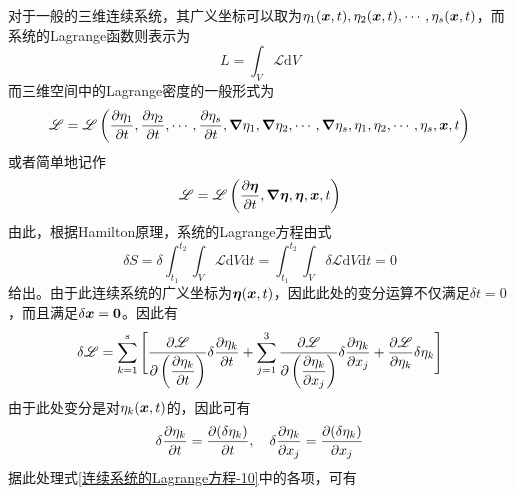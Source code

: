 对于一般的三维连续系统，其广义坐标可以取为$\eta_1(\boldsymbol{x},t),\eta_2(\boldsymbol{x},t),\cdots,\eta_s(\boldsymbol{x},t)$，而系统的Lagrange函数则表示为
\begin{equation}
	L = \int_V \mathscr{L} \mathrm{d}V
	\label{连续系统的Lagrange方程-7}
\end{equation}
而三维空间中的Lagrange密度的一般形式为
\begin{equation*}
	\mathscr{L} = \mathscr{L} \left(\frac{\partial \eta_1}{\partial t}, \frac{\partial \eta_2}{\partial t}, \cdots, \frac{\partial \eta_s}{\partial t}, \boldsymbol{\nabla} \eta_1, \boldsymbol{\nabla} \eta_2, \cdots, \boldsymbol{\nabla} \eta_s, \eta_1, \eta_2, \cdots, \eta_s, \boldsymbol{x},t\right)
\end{equation*}
或者简单地记作
\begin{equation}
	\mathscr{L} = \mathscr{L} \left(\frac{\partial \boldsymbol{\eta}}{\partial t}, \boldsymbol{\nabla} \boldsymbol{\eta}, \boldsymbol{\eta}, \boldsymbol{x},t\right)
	\label{连续系统的Lagrange方程-8}
\end{equation}
由此，根据Hamilton原理，系统的Lagrange方程由式
\begin{equation}
	\delta S = \delta \int_{t_1}^{t_2} \int_V \mathscr{L} \mathrm{d}V \mathrm{d}t = \int_{t_1}^{t_2} \int_V \delta \mathscr{L} \mathrm{d}V \mathrm{d}t = 0
	\label{连续系统的Lagrange方程-9}
\end{equation}
给出。由于此连续系统的广义坐标为$\boldsymbol{\eta}(\boldsymbol{x},t)$，因此此处的变分运算不仅满足$\delta t = 0$，而且满足$\delta \boldsymbol{x} = \boldsymbol{0}$。因此有
\begin{align}
	\delta \mathscr{L} = \sum_{k=1}^s \Bigg[\frac{\partial \mathscr{L}}{\partial \left(\dfrac{\partial \eta_k}{\partial t}\right)} \delta \dfrac{\partial \eta_k}{\partial t} + \sum_{j=1}^3 \frac{\partial \mathscr{L}}{\partial \left(\dfrac{\partial \eta_k}{\partial x_j}\right)} \delta \dfrac{\partial \eta_k}{\partial x_j} + \frac{\partial \mathscr{L}}{\partial \eta_k} \delta \eta_k\Bigg]
	\label{连续系统的Lagrange方程-10}
\end{align}
由于此处变分是对$\eta_k(\boldsymbol{x},t)$的，因此可有
\begin{equation*}
	\delta \frac{\partial \eta_k}{\partial t} = \frac{\partial (\delta \eta_k)}{\partial t},\quad \delta \frac{\partial \eta_k}{\partial x_j} = \frac{\partial (\delta \eta_k)}{\partial x_j}
\end{equation*}
据此处理式\eqref{连续系统的Lagrange方程-10}中的各项，可有
